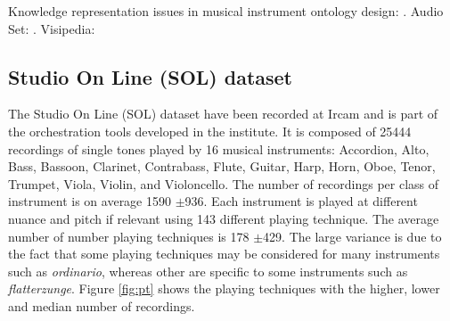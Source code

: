 \documentclass{article}
\begin{document}
Knowledge representation issues in musical instrument ontology design: \cite{kolozali2011ismir}.
Audio Set: \cite{gemmeke2017icassp}.
Visipedia: \cite{belongie2015pattern}



\subsection{Studio On Line (SOL) dataset}


The Studio On Line (SOL) dataset have been recorded at Ircam and is part of the orchestration tools developed in the institute. It is composed of 25444 recordings of single tones played by 16 musical instruments: Accordion, Alto, Bass, Bassoon, Clarinet, Contrabass, Flute, Guitar, Harp, Horn, Oboe, Tenor, Trumpet, Viola, Violin, and Violoncello. The number of recordings per class of instrument is on average 1590 $\pm$936.  Each instrument is played at different nuance and pitch if relevant using 143 different playing technique. The average number of number playing techniques is 178 $\pm$429. The large variance is due to the fact that some playing techniques may be considered for many instruments such as \textit{ordinario}, whereas other are specific to some instruments such as \textit{flatterzunge}. Figure \ref{fig:pt} shows the playing techniques with the higher, lower and median number of recordings.

\end{document}
